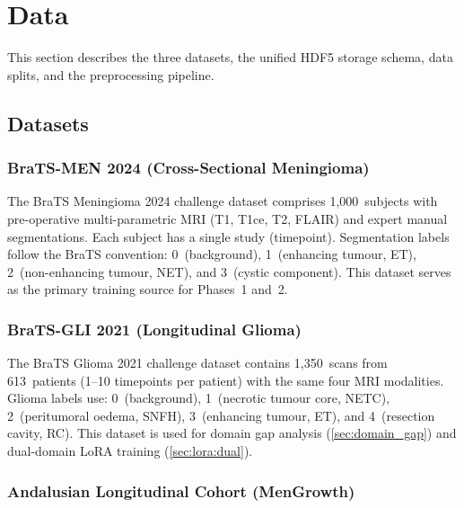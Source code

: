 \section{Data}
\label{sec:data}

This section describes the three datasets, the unified HDF5 storage schema,
data splits, and the preprocessing pipeline.

\subsection{Datasets}
\label{sec:data:datasets}

\subsubsection{BraTS-MEN 2024 (Cross-Sectional Meningioma)}

The BraTS Meningioma 2024 challenge dataset \cite{labella2024brats} comprises
1,000~subjects with pre-operative multi-parametric MRI (T1, T1ce, T2, FLAIR)
and expert manual segmentations. Each subject has a single study (timepoint).
Segmentation labels follow the BraTS convention: 0~(background), 1~(enhancing
tumour, ET), 2~(non-enhancing tumour, NET), and 3~(cystic component). This
dataset serves as the primary training source for Phases~1 and~2.

\subsubsection{BraTS-GLI 2021 (Longitudinal Glioma)}

The BraTS Glioma 2021 challenge dataset \cite{baid2021rsna} contains
1,350~scans from 613~patients (1--10 timepoints per patient) with the same
four MRI modalities. Glioma labels use: 0~(background), 1~(necrotic tumour
core, NETC), 2~(peritumoral oedema, SNFH), 3~(enhancing tumour, ET), and
4~(resection cavity, RC). This dataset is used for domain gap analysis
(\cref{sec:domain_gap}) and dual-domain LoRA training
(\cref{sec:lora:dual}).

\subsubsection{Andalusian Longitudinal Cohort (MenGrowth)}

